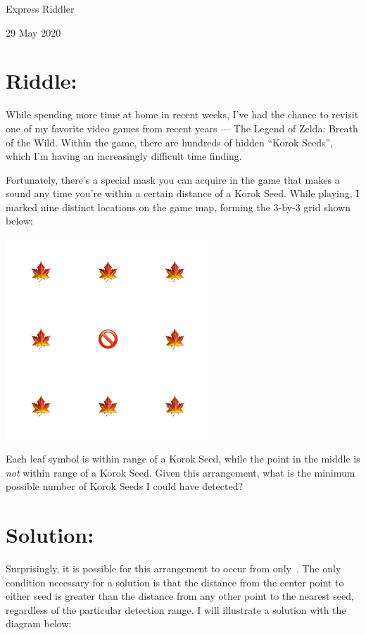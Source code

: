 \documentclass{article}
\begin{document}
\pagestyle{empty} %

\begin{center}
{\LARGE Express Riddler}

\vspace{0.15in}

{\Large 29 May 2020}
\end{center}


\section*{Riddle:}

While spending more time at home in recent weeks, I've had the chance to revisit one of my favorite video games from recent years — The Legend of Zelda: Breath of the Wild.
Within the game, there are hundreds of hidden ``Korok Seeds'', which I'm having an increasingly difficult time finding.

Fortunately, there's a special mask you can acquire in the game that makes a sound any time you're within a certain distance of a Korok Seed.
While playing, I marked nine distinct locations on the game map, forming the 3-by-3 grid shown below:
\begin{center}
\includegraphics[width=3in]{seed_map.png}
\end{center}
Each leaf symbol is within range of a Korok Seed, while the point in the middle is \textit{not} within range of a Korok Seed.
Given this arrangement, what is the minimum possible number of Korok Seeds I could have detected?

\section*{Solution:}

Surprisingly, it is possible for this arrangement to occur from only
\,.
The only condition necessary for a solution is that the distance from the center point to either seed is greater than the distance from any other point to the nearest seed, regardless of the particular detection range.
I will illustrate a solution with the diagram below:
\end{document}
